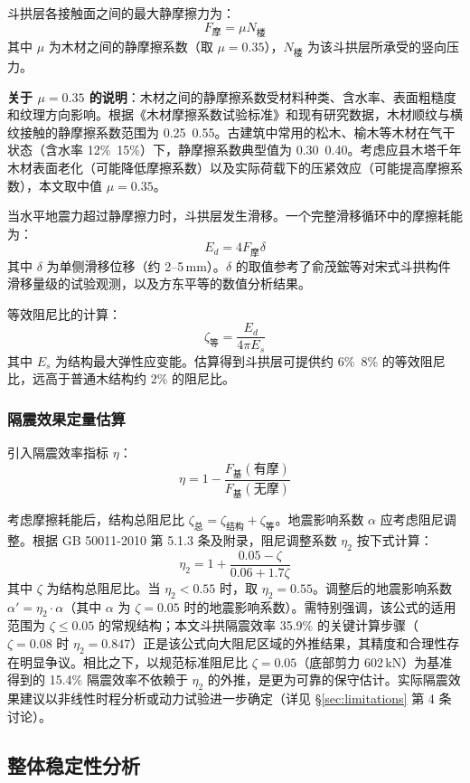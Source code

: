 \documentclass[12pt,a4paper,UTF8]{ctexart}
\begin{document}
斗拱层各接触面之间的最大静摩擦力为：
\[
    F_{\text{摩}} = \mu N_{\text{楼}}
\]
其中 $\mu$ 为木材之间的静摩擦系数（取 $\mu = 0.35$），$N_{\text{楼}}$ 为该斗拱层所承受的竖向压力。

\textbf{关于 $\mu = 0.35$ 的说明}：木材之间的静摩擦系数受材料种类、含水率、表面粗糙度和纹理方向影响。根据《木材摩擦系数试验标准》和现有研究数据\cite{li2005,wang2015}，木材顺纹与横纹接触的静摩擦系数范围为 0.25~0.55。古建筑中常用的松木、榆木等木材在气干状态（含水率 12\%~15\%）下，静摩擦系数典型值为 0.30~0.40。考虑应县木塔千年木材表面老化（可能降低摩擦系数）以及实际荷载下的压紧效应（可能提高摩擦系数），本文取中值 $\mu = 0.35$。

当水平地震力超过静摩擦力时，斗拱层发生滑移。一个完整滑移循环中的摩擦耗能为：
\[
    E_d = 4 F_{\text{摩}} \delta
\]
其中 $\delta$ 为单侧滑移位移（约 2--5\,mm）。$\delta$ 的取值参考了俞茂鋐等\cite{yu2000}对宋式斗拱构件滑移量级的试验观测，以及方东平等\cite{fang2001}的数值分析结果。

等效阻尼比的计算：
\[
    \zeta_{\text{等}} = \frac{E_d}{4\pi E_s}
\]
其中 $E_s$ 为结构最大弹性应变能。估算得到斗拱层可提供约 6\%~8\% 的等效阻尼比，远高于普通木结构约 2\% 的阻尼比。

\subsubsection{隔震效果定量估算}

引入隔震效率指标 $\eta$：
\[
    \eta = 1 - \frac{F_{\text{基}}(\text{有摩})}{F_{\text{基}}(\text{无摩})}
\]

考虑摩擦耗能后，结构总阻尼比 $\zeta_{\text{总}} = \zeta_{\text{结构}} + \zeta_{\text{等}}$。地震影响系数 $\alpha$ 应考虑阻尼调整。根据 GB 50011-2010 第 5.1.3 条及附录，阻尼调整系数 $\eta_2$ 按下式计算：
\[
    \eta_2 = 1 + \frac{0.05 - \zeta}{0.06 + 1.7\zeta}
\]
其中 $\zeta$ 为结构总阻尼比。当 $\eta_2 < 0.55$ 时，取 $\eta_2 = 0.55$。调整后的地震影响系数 $\alpha' = \eta_2 \cdot \alpha$（其中 $\alpha$ 为 $\zeta = 0.05$ 时的地震影响系数）。需特别强调，该公式的适用范围为 $\zeta \leq 0.05$ 的常规结构\cite{gb50011}；本文斗拱隔震效率 35.9\% 的关键计算步骤（$\zeta = 0.08$ 时 $\eta_2 = 0.847$）正是该公式向大阻尼区域的外推结果，其精度和合理性存在明显争议。相比之下，以规范标准阻尼比 $\zeta = 0.05$（底部剪力 602\,kN）为基准得到的 15.4\% 隔震效率不依赖于 $\eta_2$ 的外推，是更为可靠的保守估计。实际隔震效果建议以非线性时程分析或动力试验进一步确定（详见 §\ref{sec:limitations} 第 4 条讨论）。

\subsection{整体稳定性分析}
\end{document}
